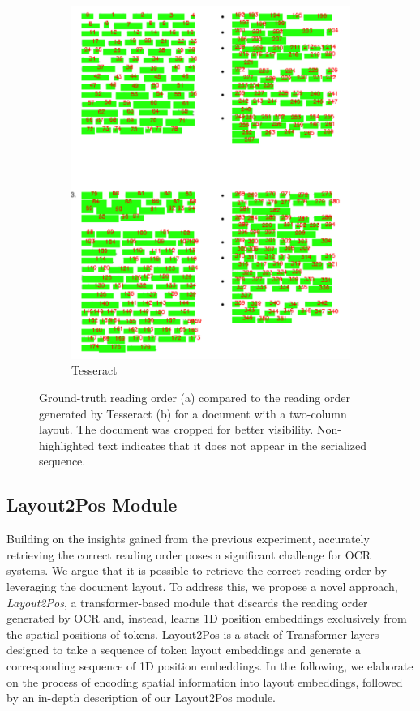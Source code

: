 \begin{figure}[!htbp]
\begin{subfigure}[b]{0.5\textwidth}
        \includegraphics[width=\textwidth]{images/chapter4/tesseract_multicolumn.pdf}
        \caption{Tesseract}
      \end{subfigure}
    \caption{Ground-truth reading order (a) compared to the reading order generated by Tesseract (b) for a document with a two-column layout. The document was cropped for better visibility. Non-highlighted text indicates that it does not appear in the serialized sequence.}
    \label{fig:reading-orders-multicolumn}
\end{figure}


\subsection{Layout2Pos Module}

Building on the insights gained from the previous experiment, accurately retrieving the correct reading order poses a significant challenge for \ac{OCR} systems. We argue that it is possible to retrieve the correct reading order by leveraging the document layout. To address this, we propose a novel approach, \textit{Layout2Pos}, a transformer-based module that discards the reading order generated by \ac{OCR} and, instead, learns 1D position embeddings exclusively from the spatial positions of tokens. Layout2Pos is a stack of Transformer layers designed to take a sequence of token layout embeddings and generate a corresponding sequence of 1D position embeddings. In the following, we elaborate on the process of encoding spatial information into layout embeddings, followed by an in-depth description of our Layout2Pos module.

